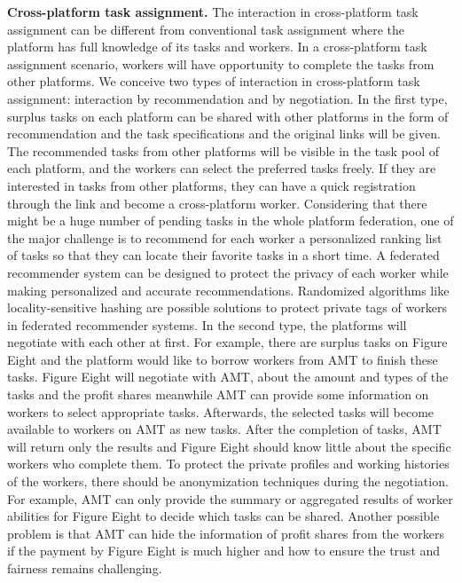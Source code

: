 \documentclass[11pt]{article}
\newcommand{\fakeparagraph}[1]{\vspace{1mm}\noindent\textbf{#1.}}
\begin{document}
\fakeparagraph{Cross-platform task assignment}
The interaction in cross-platform task assignment can be different from conventional task assignment where the platform has full knowledge of its tasks and workers.
In a cross-platform task assignment scenario, workers will have opportunity to complete the tasks from other platforms.
We conceive two types of interaction in cross-platform task assignment: interaction by recommendation and by negotiation.
In the first type, surplus tasks on each platform can be shared with other platforms in the form of recommendation and the task specifications and the original links will be given.
The recommended tasks from other platforms will be visible in the task pool of each platform, and the workers can select the preferred tasks freely.
If they are interested in tasks from other platforms, they can have a quick registration through the link and become a cross-platform worker.
Considering that there might be a huge number of pending tasks in the whole platform federation, one of the major challenge is to recommend for each worker a personalized ranking list of tasks so that they can locate their favorite tasks in a short time.
A federated recommender system can be designed to protect the privacy of each worker while making personalized and accurate recommendations.
Randomized algorithms like locality-sensitive hashing are possible solutions to protect private tags of workers in federated recommender systems. 
In the second type, the platforms will negotiate with each other at first.
For example, there are surplus tasks on Figure Eight and the platform would like to borrow workers from AMT to finish these tasks. 
Figure Eight will negotiate with AMT, about the amount and types of the tasks and the profit shares meanwhile AMT can provide some information on workers to select appropriate tasks.
Afterwards, the selected tasks will become available to workers on AMT as new tasks.
After the completion of tasks, AMT will return only the results and Figure Eight should know little about the specific workers who complete them.
To protect the private profiles and working histories of the workers, there should be anonymization techniques during the negotiation.
For example, AMT can only provide the summary or aggregated results of worker abilities for Figure Eight to decide which tasks can be shared.
Another possible problem is that AMT can hide the information of profit shares from the workers if the payment by Figure Eight is much higher and how to ensure the trust and fairness remains challenging. 
\end{document}
